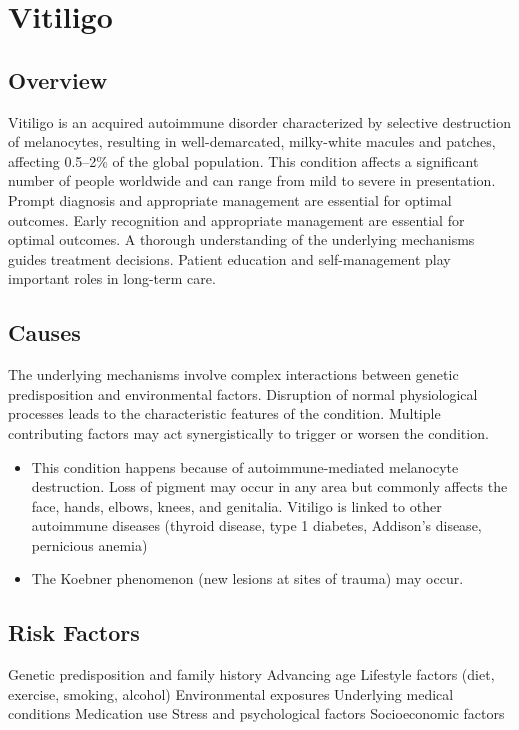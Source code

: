 \chapter{Vitiligo}
\label{sec:Vitiligo}

\section{Overview}
Vitiligo is an acquired autoimmune disorder characterized by selective destruction of melanocytes, resulting in well-demarcated, milky-white macules and patches, affecting 0.5--2\% of the global population. This condition affects a significant number of people worldwide and can range from mild to severe in presentation. Prompt diagnosis and appropriate management are essential for optimal outcomes. Early recognition and appropriate management are essential for optimal outcomes. A thorough understanding of the underlying mechanisms guides treatment decisions. Patient education and self-management play important roles in long-term care.
\section{Causes}
The underlying mechanisms involve complex interactions between genetic predisposition and environmental factors. Disruption of normal physiological processes leads to the characteristic features of the condition. Multiple contributing factors may act synergistically to trigger or worsen the condition.

\begin{itemize}[noitemsep]
  \item This condition happens because of autoimmune-mediated melanocyte destruction. Loss of pigment may occur in any area but commonly affects the face, hands, elbows, knees, and genitalia. Vitiligo is linked to other autoimmune diseases (thyroid disease, type 1 diabetes, Addison's disease, pernicious anemia)
  \item The Koebner phenomenon (new lesions at sites of trauma) may occur.
\end{itemize}
\section{Risk Factors}
Genetic predisposition and family history Advancing age Lifestyle factors (diet, exercise, smoking, alcohol) Environmental exposures Underlying medical conditions Medication use Stress and psychological factors Socioeconomic factors

